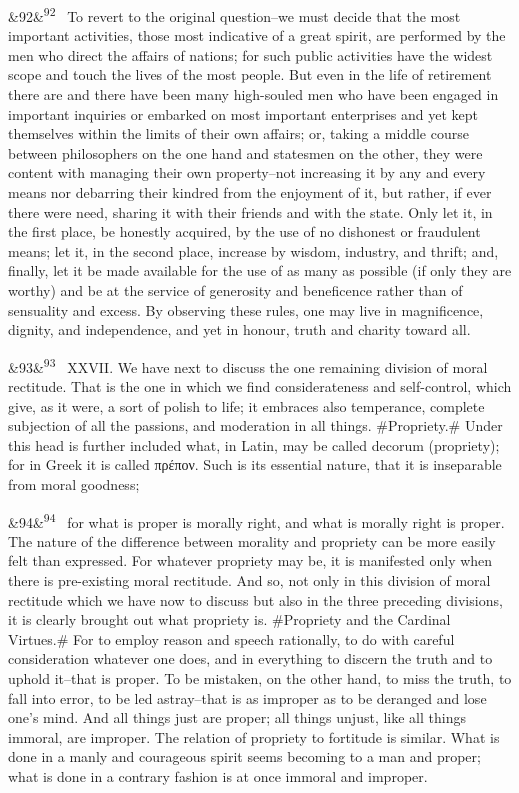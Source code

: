 \documentclass[12pt]{article}
\newcommand{\para}[1][]{\par\noindent\ifx&#1&\else\textsuperscript{\footnotesize #1}~\fi}
\begin{document}
\para[92] To revert to the original question--we must decide that the most important activities, those most indicative of a great spirit, are performed by the men who direct the affairs of nations; for such public activities have the widest scope and touch the lives of the most people. But even in the life of retirement there are and there have been many high-souled men who have been engaged in important inquiries or embarked on most important enterprises and yet kept themselves within the limits of their own affairs; or, taking a middle course between philosophers on the one hand and statesmen on the other, they were content with managing their own property--not increasing it by any and every means nor debarring their kindred from the enjoyment of it, but rather, if ever there were need, sharing it with their friends and with the state. Only let it, in the first place, be honestly acquired, by the use of no dishonest or fraudulent means; let it, in the second place, increase by wisdom, industry, and thrift; and, finally, let it be made available for the use of as many as possible (if only they are worthy) and be at the service of generosity and beneficence rather than of sensuality and excess. By observing these rules, one may live in magnificence, dignity, and independence, and yet in honour, truth and charity toward all.

\para[93] XXVII. We have next to discuss the one remaining division of moral rectitude. That is the one in which we find considerateness and self-control, which give, as it were, a sort of polish to life; it embraces also temperance, complete subjection of all the passions, and moderation in all things. \#Propriety.\# Under this head is further included what, in Latin, may be called decorum (propriety); for in Greek it is called πρέπον. Such is its essential nature, that it is inseparable from moral goodness;

\para[94] for what is proper is morally right, and what is morally right is proper. The nature of the difference between morality and propriety can be more easily felt than expressed. For whatever propriety may be, it is manifested only when there is pre-existing moral rectitude. And so, not only in this division of moral rectitude which we have now to discuss but also in the three preceding divisions, it is clearly brought out what propriety is. \#Propriety and the Cardinal Virtues.\# For to employ reason and speech rationally, to do with careful consideration whatever one does, and in everything to discern the truth and to uphold it--that is proper. To be mistaken, on the other hand, to miss the truth, to fall into error, to be led astray--that is as improper as to be deranged and lose one's mind. And all things just are proper; all things unjust, like all things immoral, are improper. The relation of propriety to fortitude is similar. What is done in a manly and courageous spirit seems becoming to a man and proper; what is done in a contrary fashion is at once immoral and improper.
\end{document}
